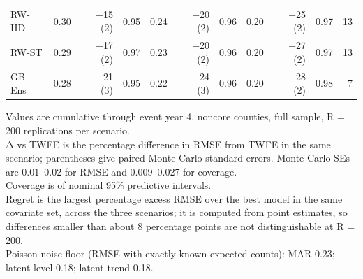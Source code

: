 \begin{table}
\begin{tabular*}{1\linewidth}{@{\extracolsep{\fill}}lrrrrrrrrrr}
RW-IID & 0.30 & −15 (2) & 0.95 & 0.24 & −20 (2) & 0.96 & 0.20 & −25 (2) & 0.97 & 13 \\ 
RW-ST & 0.29 & −17 (2) & 0.97 & 0.23 & −20 (2) & 0.96 & 0.20 & −27 (2) & 0.97 & 13 \\ 
GB-Ens & 0.28 & −21 (3) & 0.95 & 0.22 & −24 (3) & 0.96 & 0.20 & −28 (2) & 0.98 & 7 \\ 
\bottomrule
\end{tabular*}
\begin{minipage}{\linewidth}
\vspace{.05em}
Values are cumulative through event year 4, noncore counties, full sample, R = 200 replications per scenario.\\
Δ vs TWFE is the percentage difference in RMSE from TWFE in the same scenario; parentheses give paired Monte Carlo standard errors. Monte Carlo SEs are 0.01–0.02 for RMSE and 0.009–0.027 for coverage.\\
Coverage is of nominal 95\% predictive intervals.\\
Regret is the largest percentage excess RMSE over the best model in the same covariate set, across the three scenarios; it is computed from point estimates, so differences smaller than about 8 percentage points are not distinguishable at R = 200.\\
Poisson noise floor (RMSE with exactly known expected counts): MAR 0.23; latent level 0.18; latent trend 0.18.\\
\end{minipage}
\end{table}

